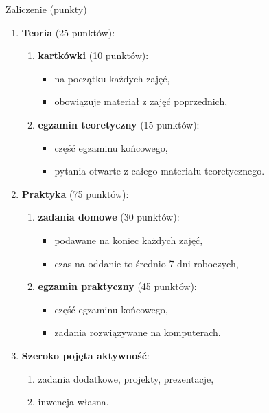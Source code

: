 \documentclass[a4paper, 11pt]{beamer}
\begin{document}
	\begin{frame}{Zaliczenie (punkty)}
		\begin{enumerate}
			\item \textbf{Teoria} (25 punktów):
			\begin{enumerate}
				\item \textbf{kartkówki} (10 punktów):
				\begin{itemize}
					\item na początku każdych zajęć,
					\item obowiązuje materiał z zajęć poprzednich,
				\end{itemize}
				\item \textbf{egzamin teoretyczny} (15 punktów):
				\begin{itemize}
					\item część egzaminu końcowego,
					\item pytania otwarte z całego materiału teoretycznego.
				\end{itemize}
			\end{enumerate}
			\item \textbf{Praktyka} (75 punktów):
			\begin{enumerate}
				\item \textbf{zadania domowe} (30 punktów):
				\begin{itemize}
					\item podawane na koniec każdych zajęć,
					\item czas na oddanie to średnio 7 dni roboczych,
				\end{itemize}
				\item \textbf{egzamin praktyczny} (45 punktów):
				\begin{itemize}
					\item część egzaminu końcowego,
					\item zadania rozwiązywane na komputerach.
				\end{itemize}
			\end{enumerate}
			\item \textbf{Szeroko pojęta aktywność}:
			\begin{enumerate}
				\item zadania dodatkowe, projekty, prezentacje,
				\item inwencja własna.
			\end{enumerate}
		\end{enumerate}
	\end{frame}
	
\end{document}
